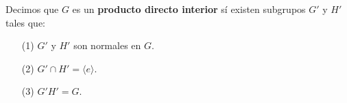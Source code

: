 \begin{definition}
    Decimos que $G$ es un  \textbf{producto directo interior} s\'i existen
    subgrupos $G'$ y  $H'$ tales que:
    \begin{enumerate}
        \item[(1)] $G'$ y  $H'$ son normales en  $G$.

        \item[(2)] $G' \cap H'=\langle e \rangle$.

        \item[(3)] $G'H'=G$.
    \end{enumerate}
\end{definition}
